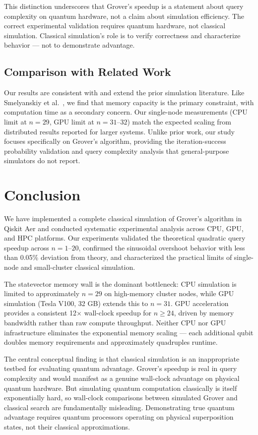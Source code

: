\documentclass[sigconf, authorversion=true, nonacm=true]{acmart}
\begin{document}
This distinction underscores that Grover's speedup is a statement about query complexity on quantum hardware, not a claim about simulation efficiency. The correct experimental validation requires quantum hardware, not classical simulation. Classical simulation's role is to verify correctness and characterize behavior — not to demonstrate advantage.

\subsection{Comparison with Related Work}

Our results are consistent with and extend the prior simulation literature. Like Smelyanskiy et al.~\cite{Smelyanskiy2016}, we find that memory capacity is the primary constraint, with computation time as a secondary concern. Our single-node measurements (CPU limit at $n=29$, GPU limit at $n=31$--$32$) match the expected scaling from distributed results reported for larger systems. Unlike prior work, our study focuses specifically on Grover's algorithm, providing the iteration-success probability validation and query complexity analysis that general-purpose simulators do not report.

\section{Conclusion}

We have implemented a complete classical simulation of Grover's algorithm in Qiskit Aer and conducted systematic experimental analysis across CPU, GPU, and HPC platforms. Our experiments validated the theoretical quadratic query speedup across $n=1$--$20$, confirmed the sinusoidal overshoot behavior with less than 0.05\% deviation from theory, and characterized the practical limits of single-node and small-cluster classical simulation.

The statevector memory wall is the dominant bottleneck: CPU simulation is limited to approximately $n=29$ on high-memory cluster nodes, while GPU simulation (Tesla V100, 32 GB) extends this to $n=31$. GPU acceleration provides a consistent 12$\times$ wall-clock speedup for $n \geq 24$, driven by memory bandwidth rather than raw compute throughput. Neither CPU nor GPU infrastructure eliminates the exponential memory scaling — each additional qubit doubles memory requirements and approximately quadruples runtime.

The central conceptual finding is that classical simulation is an inappropriate testbed for evaluating quantum advantage. Grover's speedup is real in query complexity and would manifest as a genuine wall-clock advantage on physical quantum hardware. But simulating quantum computation classically is itself exponentially hard, so wall-clock comparisons between simulated Grover and classical search are fundamentally misleading. Demonstrating true quantum advantage requires quantum processors operating on physical superposition states, not their classical approximations.
\end{document}
